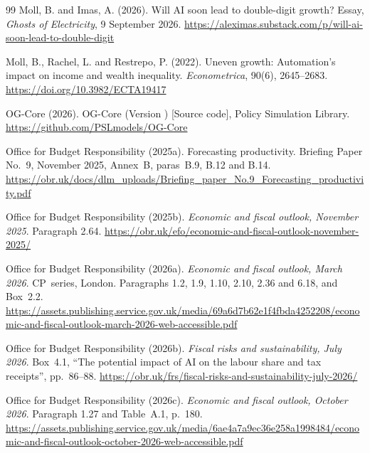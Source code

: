 \begin{thebibliography}{99}
Moll, B. and Imas, A. (2026).
\newblock Will AI soon lead to double-digit growth?
\newblock Essay, \emph{Ghosts of Electricity}, 9 September 2026.
\newblock \url{https://aleximas.substack.com/p/will-ai-soon-lead-to-double-digit}

Moll, B., Rachel, L. and Restrepo, P. (2022).
\newblock Uneven growth: Automation's impact on income and wealth inequality.
\newblock \emph{Econometrica}, 90(6), 2645--2683.
\newblock \url{https://doi.org/10.3982/ECTA19417}

OG-Core (2026).
\newblock OG-Core (Version \genOgcoreVersion{}) [Source code], Policy Simulation Library.
\newblock \url{https://github.com/PSLmodels/OG-Core}

Office for Budget Responsibility (2025a).
\newblock Forecasting productivity.
\newblock Briefing Paper No.~9, November 2025, Annex~B, paras~B.9, B.12 and B.14.
\newblock \url{https://obr.uk/docs/dlm_uploads/Briefing_paper_No.9_Forecasting_productivity.pdf}

Office for Budget Responsibility (2025b).
\newblock \emph{Economic and fiscal outlook, November 2025}.
\newblock Paragraph 2.64.
\newblock \url{https://obr.uk/efo/economic-and-fiscal-outlook-november-2025/}

Office for Budget Responsibility (2026a).
\newblock \emph{Economic and fiscal outlook, March 2026}.
\newblock CP~series, London. Paragraphs 1.2, 1.9, 1.10, 2.10, 2.36 and 6.18, and Box~2.2.
\newblock \url{https://assets.publishing.service.gov.uk/media/69a6d7b62e1f4fbda4252208/economic-and-fiscal-outlook-march-2026-web-accessible.pdf}

Office for Budget Responsibility (2026b).
\newblock \emph{Fiscal risks and sustainability, July 2026}.
\newblock Box~4.1, ``The potential impact of AI on the labour share and tax receipts'', pp.~86--88.
\newblock \url{https://obr.uk/frs/fiscal-risks-and-sustainability-july-2026/}

Office for Budget Responsibility (2026c).
\newblock \emph{Economic and fiscal outlook, October 2026}.
\newblock Paragraph 1.27 and Table~A.1, p.~180.
\newblock \url{https://assets.publishing.service.gov.uk/media/6ae4a7a9ec36e258a1998484/economic-and-fiscal-outlook-october-2026-web-accessible.pdf}


\end{thebibliography}
